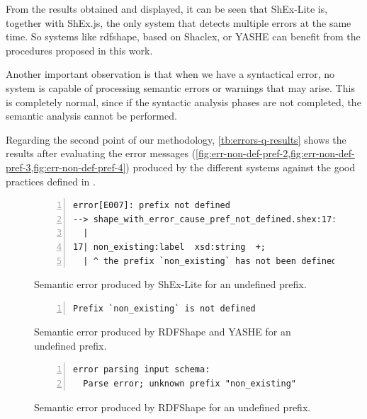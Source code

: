From the results obtained and displayed, it can be
seen that ShEx-Lite is, together with ShEx.js, the
only system that detects multiple errors at the same
time. So systems like rdfshape, based on Shaclex, or
YASHE can benefit from the procedures proposed in this
work.

Another important observation is that when we have a syntactical error,
no system is capable of processing semantic errors or warnings that may
arise. This is completely normal, since if the syntactic analysis phases
are not completed, the semantic analysis cannot be performed.

Regarding the second point of our methodology, \cref{tb:errors-q-results}
shows the results after evaluating the error messages (\cref{fig:err-non-def-pref-2,fig:err-non-def-pref-3,fig:err-non-def-pref-4})
produced by the different systems against the good practices defined in \cite{heeren2005top}.

\begin{figure}
  \begin{lstlisting}[numbers=left,basicstyle=\ttfamily\scriptsize]
error[E007]: prefix not defined
--> shape_with_error_cause_pref_not_defined.shex:17:3
  |
17| non_existing:label  xsd:string  +;
  | ^ the prefix `non_existing` has not been defined
  \end{lstlisting}
  \caption[Semantic error produced by ShEx-Lite for an undefined prefix]{Semantic error produced by ShEx-Lite for an undefined prefix.}
  \label{fig:err-non-def-pref-2}
\end{figure}

\begin{figure}
  \begin{lstlisting}[numbers=left,basicstyle=\ttfamily\scriptsize]
Prefix `non_existing` is not defined
  \end{lstlisting}
  \caption[Semantic error produced by RDFShape and YASHE for an undefined prefix]{Semantic error produced by RDFShape and YASHE for an undefined prefix.}
  \label{fig:err-non-def-pref-3}
\end{figure}

\begin{figure}[t]
  \begin{lstlisting}[numbers=left,basicstyle=\ttfamily\scriptsize]
error parsing input schema:
  Parse error; unknown prefix "non_existing"
  \end{lstlisting}
  \caption[Semantic error produced by RDFShape for an undefined prefix]{Semantic error produced by RDFShape for an undefined prefix.}
  \label{fig:err-non-def-pref-4}
\end{figure}

